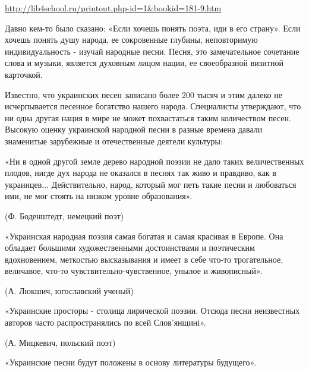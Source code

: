  
 
 
 
 
\url{http://lib4school.ru/printout.php-id=1&bookid=181-9.htm}

Давно кем-то было сказано: «Если хочешь понять поэта, иди в его страну». Если
хочешь понять душу народа, ее сокровенные глубины, неповторимую
индивидуальность - изучай народные песни. Песня, это замечательное сочетание
слова и музыки, является духовным лицом нации, ее своеобразной визитной
карточкой.



Известно, что украинских песен записано более 200 тысяч и этим далеко не
исчерпывается песенное богатство нашего народа. Специалисты утверждают, что ни
одна другая нация в мире не может похвастаться таким количеством песен. Высокую
оценку украинской народной песни в разные времена давали знаменитые зарубежные
и отечественные деятели культуры:



«Ни в одной другой земле дерево народной поэзии не дало таких величественных плодов, нигде дух народа не оказался в песнях так живо и правдиво, как в украинцев... Действительно, народ, который мог петь такие песни и любоваться ими, не мог стоять на низком уровне образования».



(Ф. Боденштедт, немецкий поэт)



«Украинская народная поэзия самая богатая и самая красивая в Европе. Она обладает большими художественными достоинствами и поэтическим вдохновением, меткостью высказывания и имеет в себе что-то трогательное, величавое, что-то чувствительно-чувственное, унылое и живописный».



(А. Люкшич, югославский ученый)



«Украинские просторы - столица лирической поэзии. Отсюда песни неизвестных авторов часто распространялись по всей Слов'янщині».



(А. Мицкевич, польский поэт)



«Украинские песни будут положены в основу литературы будущего».



